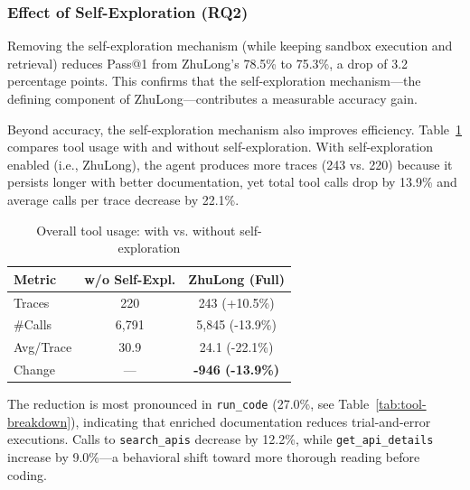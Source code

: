 \documentclass[anonymous, sigconf]{acmart}
\begin{document}
\subsubsection{Effect of Self-Exploration (RQ2)}

Removing the self-exploration mechanism (while keeping sandbox execution and retrieval) reduces Pass@1 from ZhuLong's 78.5\% to 75.3\%, a drop of 3.2 percentage points. This confirms that the self-exploration mechanism---the defining component of ZhuLong---contributes a measurable accuracy gain.

Beyond accuracy, the self-exploration mechanism also improves efficiency. Table~\ref{tab:selfdoc-efficiency} compares tool usage with and without self-exploration. With self-exploration enabled (i.e., ZhuLong), the agent produces more traces (243 vs. 220) because it persists longer with better documentation, yet total tool calls drop by 13.9\% and average calls per trace decrease by 22.1\%.

\begin{table}[htbp]
\centering
\caption{Overall tool usage: with vs. without self-exploration}
\label{tab:selfdoc-efficiency}
\begin{tabular}{lcc}
\toprule
\textbf{Metric} & \textbf{w/o Self-Expl.} & \textbf{ZhuLong (Full)} \\
\midrule
Traces & 220 & 243 (+10.5\%) \\
\#Calls & 6,791 & 5,845 (-13.9\%) \\
Avg/Trace & 30.9 & 24.1 (-22.1\%) \\
\midrule
Change & — & \textbf{-946 (-13.9\%)} \\
\bottomrule
\end{tabular}
\end{table}

The reduction is most pronounced in \texttt{run\_code} (27.0\%, see Table~\ref{tab:tool-breakdown}), indicating that enriched documentation reduces trial-and-error executions. Calls to \texttt{search\_apis} decrease by 12.2\%, while \texttt{get\_api\_details} increase by 9.0\%---a behavioral shift toward more thorough reading before coding.
\end{document}
